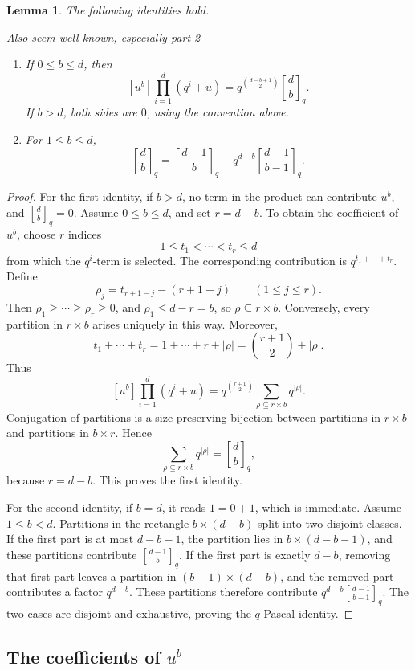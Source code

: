 \documentclass[12pt]{article}
\newtheorem{lemma}[theorem]{Lemma}
\newcommand{\qbinom}[2]{\genfrac{[}{]}{0pt}{}{#1}{#2}_q}
\newcommand{\review}[1]{\begin{reviewbox}#1\end{reviewbox}}
\begin{document}
\begin{lemma}\label{lem:gaussian}
The following identities hold.
\review{Also seem well-known, especially part 2}
\begin{enumerate}
\item If \(0\le b\le d\), then
\[
[u^b]\prod_{i=1}^{d}(q^i+u)
=
q^{\binom{d-b+1}{2}}\qbinom{d}{b}.
\]
If \(b>d\), both sides are \(0\), using the convention above.

\item For \(1\le b\le d\),
\[
\qbinom{d}{b}
=
\qbinom{d-1}{b}
+
q^{d-b}\qbinom{d-1}{b-1}.
\]
\end{enumerate}
\end{lemma}

\begin{proof}
For the first identity, if \(b>d\), no term in the product can contribute \(u^b\), and \(\qbinom{d}{b}=0\).  Assume \(0\le b\le d\), and set \(r=d-b\).  To obtain the coefficient of \(u^b\), choose \(r\) indices
\[
1\le t_1<\cdots<t_r\le d
\]
from which the \(q^i\)-term is selected.  The corresponding contribution is \(q^{t_1+\cdots+t_r}\).  Define
\[
\rho_j=t_{r+1-j}-(r+1-j)\qquad (1\le j\le r).
\]
Then \(\rho_1\ge \cdots\ge \rho_r\ge 0\), and \(\rho_1\le d-r=b\), so \(\rho\subseteq r\times b\).  Conversely, every partition in \(r\times b\) arises uniquely in this way.  Moreover,
\[
t_1+\cdots+t_r
=
1+\cdots+r+|\rho|
=
\binom{r+1}{2}+|\rho|.
\]
Thus
\[
[u^b]\prod_{i=1}^{d}(q^i+u)
=
q^{\binom{r+1}{2}}
\sum_{\rho\subseteq r\times b}q^{|\rho|}.
\]
Conjugation of partitions is a size-preserving bijection between partitions in \(r\times b\) and partitions in \(b\times r\).  Hence
\[
\sum_{\rho\subseteq r\times b}q^{|\rho|}
=
\qbinom{d}{b},
\]
because \(r=d-b\).  This proves the first identity.

For the second identity, if \(b=d\), it reads \(1=0+1\), which is immediate.  Assume \(1\le b<d\).  Partitions in the rectangle \(b\times(d-b)\) split into two disjoint classes.  If the first part is at most \(d-b-1\), the partition lies in \(b\times(d-b-1)\), and these partitions contribute \(\qbinom{d-1}{b}\).  If the first part is exactly \(d-b\), removing that first part leaves a partition in \((b-1)\times(d-b)\), and the removed part contributes a factor \(q^{d-b}\).  These partitions therefore contribute \(q^{d-b}\qbinom{d-1}{b-1}\).  The two cases are disjoint and exhaustive, proving the \(q\)-Pascal identity.
\end{proof}

\subsection{The coefficients of \(u^b\)}
\end{document}
